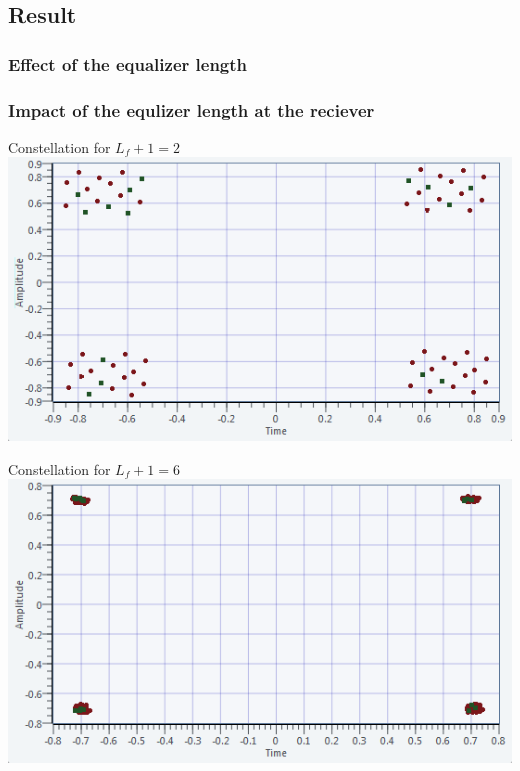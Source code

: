 \documentclass[11pt]{beamer}
\begin{document}
\subsection{Result}
\subsubsection{Effect of the equalizer length}
\begin{frame}
\frametitle{Impact of the equlizer length at the reciever}
\begin{minipage}[c]{0.46\linewidth}
\centering 
{Constellation for $L_f + 1 = 2$}
\includegraphics[width=\textwidth]{img/ISI-2}
\end{minipage}
\begin{minipage}[c]{0.46\linewidth}
\centering 
{Constellation for $L_f + 1 = 6$}
\includegraphics[width=\textwidth]{img/ISI-6}
\end{minipage}
\end{frame}
\end{document}
